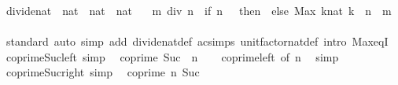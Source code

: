 \begin{isabellebody}
\isanewline
{}\isamarkupfalse%
\ divide{\isacharunderscore}{\kern0pt}nat\ {\isacharcolon}{\kern0pt}{\isacharcolon}{\kern0pt}\ {\isachardoublequoteopen}nat\ {\isasymRightarrow}\ nat\ {\isasymRightarrow}\ nat{\isachardoublequoteclose}\isanewline
\ \ \ {\isachardoublequoteopen}m\ div\ n\ {\isacharequal}{\kern0pt}\ {\isacharparenleft}{\kern0pt}if\ n\ {\isacharequal}{\kern0pt}\ {}\ then\ {}\ else\ Max\ {\isacharbraceleft}{\kern0pt}k{\isacharcolon}{\kern0pt}{\isacharcolon}{\kern0pt}nat{\isachardot}{\kern0pt}\ k\ {\isacharasterisk}{\kern0pt}\ n\ {\isasymle}\ m{\isacharbraceright}{\kern0pt}{\isacharparenright}{\kern0pt}{\isachardoublequoteclose}\isanewline
\isanewline
{}\isamarkupfalse%
\isanewline
%
\isadelimproof
\ \ %
\endisadelimproof
%
\isatagproof
{}\isamarkupfalse%
\ standard\ {\isacharparenleft}{\kern0pt}auto\ simp\ add{\isacharcolon}{\kern0pt}\ divide{\isacharunderscore}{\kern0pt}nat{\isacharunderscore}{\kern0pt}def\ ac{\isacharunderscore}{\kern0pt}simps\ unit{\isacharunderscore}{\kern0pt}factor{\isacharunderscore}{\kern0pt}nat{\isacharunderscore}{\kern0pt}def\ intro{\isacharcolon}{\kern0pt}\ Max{\isacharunderscore}{\kern0pt}eqI{\isacharparenright}{\kern0pt}%
\endisatagproof
{\isafoldproof}%
%
\isadelimproof
\isanewline
%
\endisadelimproof
\isanewline
{}\isamarkupfalse%
\isanewline
\isanewline
{}\isamarkupfalse%
\ coprime{\isacharunderscore}{\kern0pt}Suc{\isacharunderscore}{\kern0pt}{}{\isacharunderscore}{\kern0pt}left\ {\isacharbrackleft}{\kern0pt}simp{\isacharbrackright}{\kern0pt}{\isacharcolon}{\kern0pt}\isanewline
\ \ {\isachardoublequoteopen}coprime\ {\isacharparenleft}{\kern0pt}Suc\ {}{\isacharparenright}{\kern0pt}\ n{\isachardoublequoteclose}\isanewline
%
\isadelimproof
\ \ %
\endisadelimproof
%
\isatagproof
{}\isamarkupfalse%
\ coprime{\isacharunderscore}{\kern0pt}{}{\isacharunderscore}{\kern0pt}left\ {\isacharbrackleft}{\kern0pt}of\ n{\isacharbrackright}{\kern0pt}\ \isamarkupfalse%
\ simp%
\endisatagproof
{\isafoldproof}%
%
\isadelimproof
\isanewline
%
\endisadelimproof
\isanewline
{}\isamarkupfalse%
\ coprime{\isacharunderscore}{\kern0pt}Suc{\isacharunderscore}{\kern0pt}{}{\isacharunderscore}{\kern0pt}right\ {\isacharbrackleft}{\kern0pt}simp{\isacharbrackright}{\kern0pt}{\isacharcolon}{\kern0pt}\isanewline
\ \ {\isachardoublequoteopen}coprime\ n\ {\isacharparenleft}{\kern0pt}Suc\ {}{\isacharparenright}{\kern0pt}{\isachardoublequoteclose}\isanewline

\end{isabellebody}
